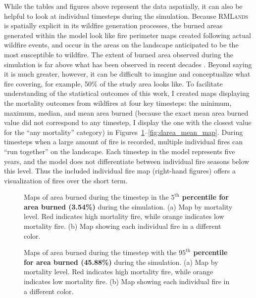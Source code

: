 While the tables and figures above represent the data aspatially, it can also be helpful to look at individual timesteps during the simulation. Because \textsc{RMLands} is spatially explicit in its wildfire generation processes, the burned areas generated within the model look like fire perimeter maps created following actual wildfire events, and occur in the areas on the landscape anticipated to be the most susceptible to wildfire. The extent of burned area observed during the simulation is far above what has been observed in recent decades \citep{calfire2012,usgs-fire-data2012}. Beyond saying it is much greater, however, it can be difficult to imagine and conceptualize what fire covering, for example, 50\% of the study area looks like. To facilitate understanding of the statistical outcomes of this work, I created maps displaying the mortality outcomes from wildfires at four key timesteps: the minimum, maximum, median, and mean area burned (because the exact mean area burned value did not correspond to any timestep, I display the one with the closest value for the ``any mortality'' category) in Figures~\ref{fig:darea_min_map}--\ref{fig:darea_mean_map}. During timesteps when a large amount of fire is recorded, multiple individual fires can ``run together'' on the landscape. Each timestep in the model represents five years, and the model does not differentiate between individual fire seasons below this level. Thus the included individual fire map (right-hand figures) offers a visualization of fires over the short term.

\newpage

\begin{figure}[!htbp]
  \centering
  \caption{Maps of area burned during the timestep in the \textbf{$5^{\text{th}}$ percentile for area burned (3.54\%)} during the simulation. (a) Map by mortality level. Red indicates high mortality fire, while orange indicates low mortality fire. (b) Map showing each individual fire in a different color.}
  \label{fig:darea_min_map}
\end{figure}

\begin{figure}[!htbp]
  \centering
  \caption{Maps of area burned during the timestep with the \textbf{$95^{\text{th}}$ percentile for area burned (45.88\%)} during the simulation. (a) Map by mortality level. Red indicates high mortality fire, while orange indicates low mortality fire. (b) Map showing each individual fire in a different color.}
  \label{fig:darea_max_map}
\end{figure}

